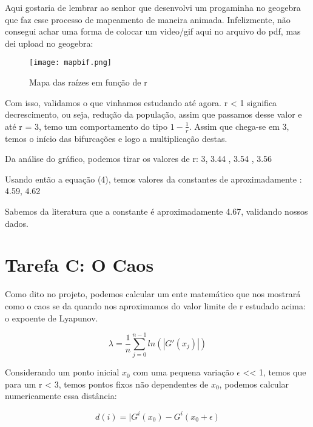 \documentclass[a4paper, 12pt]{article}
\begin{document}
Aqui gostaria de lembrar ao senhor que desenvolvi um progaminha no geogebra que faz esse processo de mapeamento de maneira animada. Infelizmente, não consegui achar uma forma de colocar um video/gif aqui no arquivo do pdf, mas dei upload no geogebra:

\hfill

\color{red}{https://www.geogebra.org/m/wmnhebcy}

\hfill

\begin{figure}[H]
    \centering
    \texttt{[image: mapbif.png]}
    \caption{Mapa das raízes em função de r}
\end{figure}

\color{black}

Com isso, validamos o que vinhamos estudando até agora. r < 1 significa decrescimento, ou seja, redução da população, assim que passamos desse valor e até r = 3, temo um comportamento do tipo $1 - \frac{1}{r}$. Assim que chega-se em 3, temos o início das bifurcações e logo a multiplicação destas.

Da análise do gráfico, podemos tirar os valores de r: 3, 3.44 , 3.54 , 3.56

Usando então a equação (4), temos valores da constantes de aproximadamente : 4.59, 4.62

Sabemos da literatura que a constante é aproximadamente 4.67, validando nossos dados.

\section{Tarefa C: O Caos}

Como dito no projeto, podemos calcular um ente matemático que nos mostrará como o caos se da quando nos aproximamos do valor limite de r estudado acima: o expoente de Lyapunov.

\begin{equation}
    \lambda = \frac{1}{n} \sum_{j = 0}^{n-1} ln(|G'(x_{j})|)
\end{equation}

Considerando um ponto inicial $x_{0}$ com uma pequena variação $\epsilon$ << 1, temos que para um r < 3, temos pontos fixos não dependentes de $x_{0}$, podemos calcular numericamente essa distância:

\begin{equation}
    d(i) = | G^{i}(x_{0}) - G^{i}(x_{0} + \epsilon)
\end{equation}
\end{document}
